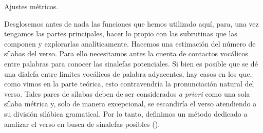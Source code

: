 \begin{algorithm}[!ht]
	\caption{Ajustes métricos.}\label{list:VerSeMetre1}
\end{algorithm}

Desglosemos antes de nada las funciones que hemos utilizado aquí, para, una vez tengamos las partes principales, hacer lo propio con las subrutinas que las componen y explorarlas analíticamente. Hacemos una estimación del número de sílabas del verso. Para ello necesitamos antes la cuenta de contactos vocálicos entre palabras para conocer las sinalefas potenciales. Si bien es posible que se dé una dialefa entre límites vocálicos de palabra adyacentes, hay casos en los que, como vimos en la parte teórica, esto contravendría la pronunciación natural del verso. Tales pares de sílabas deben de ser considerados \textit{a priori} como una sola sílaba métrica y, solo de manera excepcional, se escandiría el verso atendiendo a su división silábica gramatical. Por lo tanto, definimos un método dedicado a analizar el verso en busca de sinalefas posibles ().

